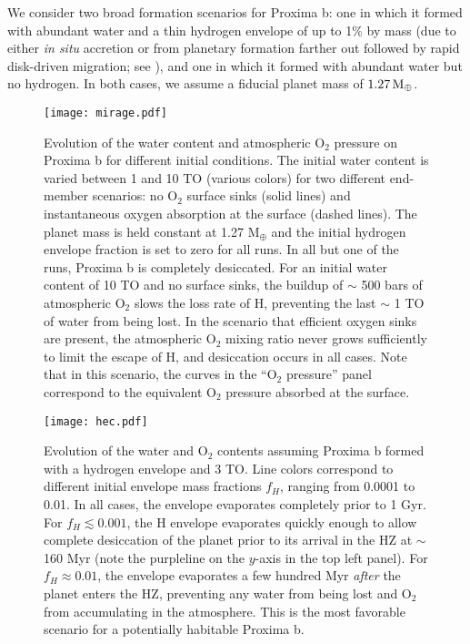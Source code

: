 \documentclass[preprint,12pt]{aastex}
\def\mearth{{\rm\,M_\oplus}}
\begin{document}
We consider two broad formation scenarios for Proxima b: one in which
it formed with abundant water and a thin hydrogen envelope of up to
1\% by mass (due to either \emph{in situ} accretion or from planetary
formation farther out followed by rapid disk-driven migration; see
\cite{Luger15}), and one in which it formed with abundant water but no
hydrogen. In both cases, we assume a fiducial planet mass of $1.27
\mearth$.

\begin{figure}[ht]
\centering
\texttt{[image: mirage.pdf]}
\caption{Evolution of the water content and atmospheric O$_2$ pressure
  on Proxima b for different initial conditions. The initial water
  content is varied between 1 and 10 TO (various colors) for two
  different end-member scenarios: no O$_2$ surface sinks (solid lines)
  and instantaneous oxygen absorption at the surface (dashed
  lines). The planet mass is held constant at 1.27 M$_\oplus$ and the
  initial hydrogen envelope fraction is set to zero for all runs. In
  all but one of the runs, Proxima b is completely desiccated. For an
  initial water content of 10 TO and no surface sinks, the buildup of
  $\sim$ 500 bars of atmospheric O$_2$ slows the loss rate of H,
  preventing the last $\sim$ 1 TO of water from being lost. In the
  scenario that efficient oxygen sinks are present, the atmospheric
  O$_2$ mixing ratio never grows sufficiently to limit the escape of
  H, and desiccation occurs in all cases. Note that in this scenario,
  the curves in the ``O$_2$ pressure'' panel correspond to the
  equivalent O$_2$ pressure absorbed at the surface.\vspace{0.2in}}
\label{fig:atmesc:mirage}
\end{figure}

\begin{figure}[ht]
\centering
\texttt{[image: hec.pdf]}
\caption{Evolution of the water and O$_2$ contents assuming Proxima b
  formed with a hydrogen envelope and 3 TO. Line colors correspond to
  different initial envelope mass fractions $f_H$, ranging from 0.0001
  to 0.01. In all cases, the envelope evaporates completely prior to 1
  Gyr. For $f_H \lesssim 0.001$, the H envelope evaporates quickly
  enough to allow complete desiccation of the planet prior to its
  arrival in the HZ at $\sim$ 160 Myr (note the purpleline on the $y$-axis in the top left panel). For $f_H \approx 0.01$, the
  envelope evaporates a few hundred Myr \emph{after} the planet enters
  the HZ, preventing any water from being lost and O$_2$ from
  accumulating in the atmosphere.  This is the most favorable scenario
  for a potentially habitable Proxima b.\vspace{0.2in}}
\label{fig:atmesc:hec}
\end{figure}
\end{document}
